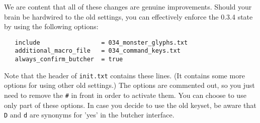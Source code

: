 \documentclass[a4paper,10pt]{article}
\newcommand{\key}[1]{{\texttt{#1}}} %
\newcommand{\para}{\vspace{1.5ex}}
\begin{document}
\para

We are content that all of these changes are genuine improvements. Should
your brain be hardwired to the old settings, you can effectively enforce
the 0.3.4 state by using the following options:
\begin{verbatim}
   include                 = 034_monster_glyphs.txt
   additional_macro_file   = 034_command_keys.txt
   always_confirm_butcher  = true
\end{verbatim}

Note that the header of \key{init.txt} contains these lines. (It contains 
some more options for using other old settings.) The options are commented 
out, so you just need to remove the \key{\#} in front in order to activate 
them. You can choose to use only part of these options. In case you decide 
to use the old keyset, be aware that \key{D} and \key{d} are synonyms for 
'yes' in the butcher interface.
\end{document}
